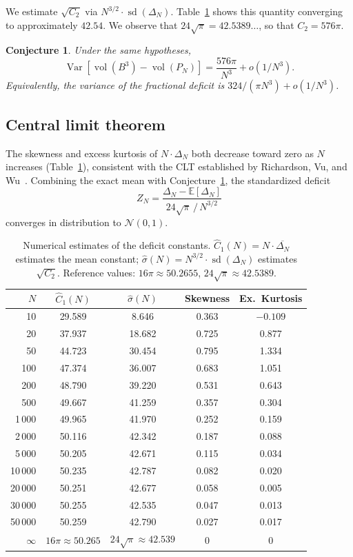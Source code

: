 \documentclass[11pt]{article}
\newtheorem{conjecture}{Conjecture}
\begin{document}
We estimate $\sqrt{C_2}$ via $N^{3/2} \cdot
\operatorname{sd}(\Delta_N)$.  Table~\ref{tab:data} shows this
quantity converging to approximately $42.54$.  We observe that
$24\sqrt{\pi} = 42.5389\ldots$, so that $C_2 = 576\pi$.

\begin{conjecture}\label{conj:var}
Under the same hypotheses,
\[
  \operatorname{Var}\!\left[\operatorname{vol}(B^3) -
  \operatorname{vol}(P_N)\right] = \frac{576\pi}{N^3} + o(1/N^3).
\]
Equivalently, the variance of the fractional deficit is $324/(\pi
N^3) + o(1/N^3)$.
\end{conjecture}

\subsection{Central limit theorem}

The skewness and excess kurtosis of $N \cdot \Delta_N$ both
decrease toward zero as $N$ increases (Table~\ref{tab:data}),
consistent with the CLT established by Richardson, Vu, and
Wu~\cite{RVW2008}.  Combining the exact mean with
Conjecture~\ref{conj:var}, the standardized deficit
\[
  Z_N = \frac{\Delta_N - \mathbb{E}[\Delta_N]}{24\sqrt{\pi}\,/\,N^{3/2}}
\]
converges in distribution to $\mathcal{N}(0,1)$.

\begin{table}[t]
\centering
\caption{Numerical estimates of the deficit constants.  $\hat{C}_1(N) = N \cdot \overline{\Delta_N}$ estimates the mean constant;
$\hat{\sigma}(N) = N^{3/2} \cdot \operatorname{sd}(\Delta_N)$ estimates $\sqrt{C_2}$.  Reference values: $16\pi \approx 50.2655$, $24\sqrt{\pi} \approx 42.5389$.}
\label{tab:data}
\smallskip
\begin{tabular}{@{}rcccc@{}}
\toprule
$N$ & $\hat{C}_1(N)$ & $\hat{\sigma}(N)$ & Skewness & Ex.\ Kurtosis \\
\midrule
10      & 29.589 &  8.646 & 0.363 & $-0.109$ \\
20      & 37.937 & 18.682 & 0.725 & 0.877 \\
50      & 44.723 & 30.454 & 0.795 & 1.334 \\
100     & 47.374 & 36.007 & 0.683 & 1.051 \\
200     & 48.790 & 39.220 & 0.531 & 0.643 \\
500     & 49.667 & 41.259 & 0.357 & 0.304 \\
1\,000  & 49.965 & 41.970 & 0.252 & 0.159 \\
2\,000  & 50.116 & 42.342 & 0.187 & 0.088 \\
5\,000  & 50.205 & 42.671 & 0.115 & 0.034 \\
10\,000 & 50.235 & 42.787 & 0.082 & 0.020 \\
20\,000 & 50.251 & 42.677 & 0.058 & 0.005 \\
30\,000 & 50.255 & 42.535 & 0.047 & 0.013 \\
50\,000 & 50.259 & 42.790 & 0.027 & 0.017 \\
\midrule
$\infty$ & $16\pi \approx 50.265$ & $24\sqrt{\pi} \approx 42.539$ & 0 & 0 \\
\bottomrule
\end{tabular}
\end{table}
\end{document}
